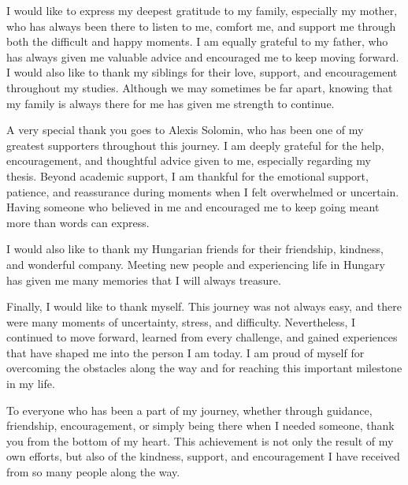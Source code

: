 I would like to express my deepest gratitude to my family, especially my mother, who has always been there to listen to me, comfort me, and support me through both the difficult and happy moments. I am equally grateful to my father, who has always given me valuable advice and encouraged me to keep moving forward. I would also like to thank my siblings for their love, support, and encouragement throughout my studies. Although we may sometimes be far apart, knowing that my family is always there for me has given me strength to continue.

A very special thank you goes to Alexis Solomin, who has been one of my greatest supporters throughout this journey. I am deeply grateful for the help, encouragement, and thoughtful advice given to me, especially regarding my thesis. Beyond academic support, I am thankful for the emotional support, patience, and reassurance during moments when I felt overwhelmed or uncertain. Having someone who believed in me and encouraged me to keep going meant more than words can express.

I would also like to thank my Hungarian friends for their friendship, kindness, and wonderful company. Meeting new people and experiencing life in Hungary has given me many memories that I will always treasure.

Finally, I would like to thank myself. This journey was not always easy, and there were many moments of uncertainty, stress, and difficulty. Nevertheless, I continued to move forward, learned from every challenge, and gained experiences that have shaped me into the person I am today. I am proud of myself for overcoming the obstacles along the way and for reaching this important milestone in my life.

To everyone who has been a part of my journey, whether through guidance, friendship, encouragement, or simply being there when I needed someone, thank you from the bottom of my heart. This achievement is not only the result of my own efforts, but also of the kindness, support, and encouragement I have received from so many people along the way.
